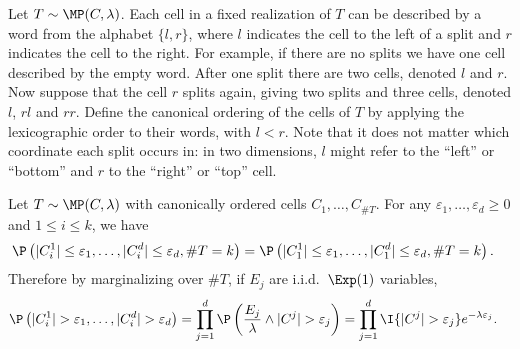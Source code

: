 \documentclass{article}
\begin{document}
\begin{definition}

  Let $T \sim \MP(C, \lambda)$.
  Each cell in a fixed realization of $T$ can be described by
  a word from the alphabet $\{l, r\}$,
  where $l$ indicates the cell to the left of a split
  and $r$ indicates the cell to the right.
  For example, if there are no splits we have one cell
  described by the empty word.
  After one split there are two cells, denoted
  $l$ and $r$.
  Now suppose that the cell $r$ splits again, giving two splits and three cells,
  denoted $l$, $rl$ and $rr$.
  Define the canonical ordering of the cells of $T$ by applying
  the lexicographic order to their words, with $l < r$.
  Note that it does not matter which coordinate each split occurs in:
  in two dimensions, $l$ might refer to the ``left'' or ``bottom''
  and $r$ to the ``right'' or ``top'' cell.

\end{definition}




\begin{lemma}
  \label{lem:cells_identically_distributed}

  Let $T \sim \MP(C, \lambda)$
  with canonically ordered cells
  $C_1, \ldots, C_{\# T}$.
  For any $\varepsilon_1, \ldots, \varepsilon_d \geq 0$
  and $1 \leq i \leq k$, we have
  \begin{align*}
    \P\left(
    |C_i^1| \leq \varepsilon_1,
    \ldots, |C_i^d| \leq \varepsilon_d,
    \# T = k
    \right)
    &=
      \P\left(
      |C_1^1| \leq \varepsilon_1,
      \ldots, |C_1^d| \leq \varepsilon_d,
      \# T = k
      \right).
  \end{align*}
  Therefore by marginalizing over $\# T$,
  if $E_j$ are i.i.d.\ $\Exp(1)$ variables,
  \begin{align*}
    \P\left(
    |C_i^1| > \varepsilon_1,
    \ldots, |C_i^d| > \varepsilon_d
    \right)
    &=
      \prod_{j=1}^d
      \P\left(
      \frac{E_j}{\lambda} \wedge |C^j|
      > \varepsilon_j
      \right)
      = \prod_{j=1}^d
      \I\{|C^j| > \varepsilon_j\}
      e^{-\lambda \varepsilon_j}.
  \end{align*}

\end{lemma}
\end{document}
